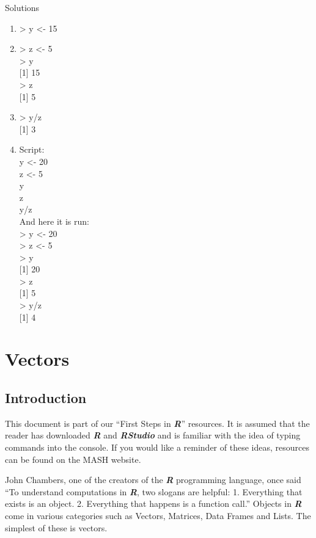 \documentclass[
]{book}
\begin{document}
Solutions

\begin{enumerate}
\def\labelenumi{\arabic{enumi}.}
\item
  \textgreater{} y \textless- 15
\item
  \textgreater{} z \textless- 5\\
  \textgreater{} y\\
  {[}1{]} 15\\
  \textgreater{} z\\
  {[}1{]} 5
\item
  \textgreater{} y/z\\
  {[}1{]} 3
\item
  Script:\\
  y \textless- 20\\
  z \textless- 5\\
  y\\
  z\\
  y/z\\
  And here it is run:\\
  \textgreater{} y \textless- 20\\
  \textgreater{} z \textless- 5\\
  \textgreater{} y\\
  {[}1{]} 20\\
  \textgreater{} z\\
  {[}1{]} 5\\
  \textgreater{} y/z\\
  {[}1{]} 4
\end{enumerate}

\chapter{Vectors}\label{vectors}

\section{Introduction}\label{introduction-2}

This document is part of our ``First Steps in \textbf{\emph{R}}'' resources. It is assumed that the reader has downloaded \textbf{\emph{R}} and \textbf{\emph{RStudio}} and is familiar with the idea of typing commands into the console. If you would like a reminder of these ideas, resources can be found on the MASH website.

John Chambers, one of the creators of the \textbf{\emph{R}} programming language, once said ``To understand computations in \textbf{\emph{R}}, two slogans are helpful: 1. Everything that exists is an object. 2. Everything that happens is a function call.'' Objects in \textbf{\emph{R}} come in various categories such as Vectors, Matrices, Data Frames and Lists. The simplest of these is vectors.
\end{document}
